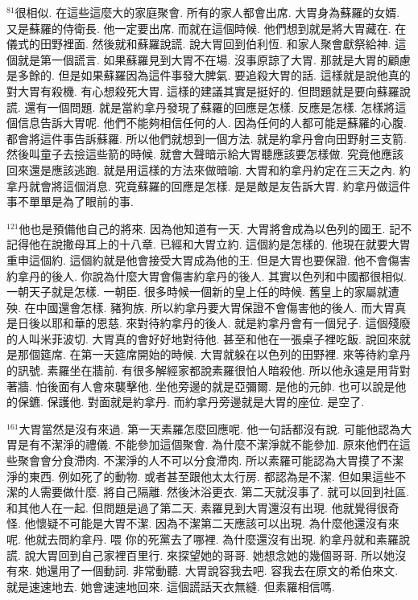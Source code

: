 \documentclass{book}
\begin{document}
$^{81}$很相似.
在這些這麼大的家庭聚會.
所有的家人都會出席.
大胃身為蘇羅的女婿.
又是蘇羅的侍衛長.
他一定要出席.
而就在這個時候.
他們想到就是將大胃藏在.
在儀式的田野裡面.
然後就和蘇羅說謊.
說大胃回到伯利恆.
和家人聚會獻祭給神.
這個就是第一個謊言.
如果蘇羅見到大胃不在場.
沒事原諒了大胃.
那就是大胃的顧慮是多餘的.
但是如果蘇羅因為這件事發大脾氣.
要追殺大胃的話.
這樣就是說他真的對大胃有殺機.
有心想殺死大胃.
這樣的建議其實是挺好的.
但問題就是要向蘇羅說謊.
還有一個問題.
就是當約拿丹發現了蘇羅的回應是怎樣.
反應是怎樣.
怎樣將這個信息告訴大胃呢.
他們不能夠相信任何的人.
因為任何的人都可能是蘇羅的心腹.
都會將這件事告訴蘇羅.
所以他們就想到一個方法.
就是約拿丹會向田野射三支箭.
然後叫童子去撿這些箭的時候.
就會大聲暗示給大胃聽應該要怎樣做.
究竟他應該回來還是應該逃跑.
就是用這樣的方法來做暗喻.
大胃和約拿丹約定在三天之內.
約拿丹就會將這個消息.
究竟蘇羅的回應是怎樣.
是是敵是友告訴大胃.
約拿丹做這件事不單單是為了眼前的事.

$^{121}$他也是預備他自己的將來.
因為他知道有一天.
大胃將會成為以色列的國王.
記不記得他在說撒母耳上的十八章.
已經和大胃立約.
這個約是怎樣的.
他現在就要大胃重申這個約.
這個約就是他會接受大胃成為他的王.
但是大胃也要保證.
他不會傷害約拿丹的後人.
你說為什麼大胃會傷害約拿丹的後人.
其實以色列和中國都很相似.
一朝天子就是怎樣.
一朝臣.
很多時候一個新的皇上任的時候.
舊皇上的家屬就遭殃.
在中國還會怎樣.
豬狗族.
所以約拿丹要大胃保證不會傷害他的後人.
而大胃真是日後以耶和華的恩慈.
來對待約拿丹的後人.
就是約拿丹會有一個兒子.
這個殘廢的人叫米菲波切.
大胃真的會好好地對待他.
甚至和他在一張桌子裡吃飯.
說回來就是那個筵席.
在第一天筵席開始的時候.
大胃就躲在以色列的田野裡.
來等待約拿丹的訊號.
素羅坐在牆前.
有很多解經家都說素羅很怕人暗殺他.
所以他永遠是用背對著牆.
怕後面有人會來襲擊他.
坐他旁邊的就是亞彌爾.
是他的元帥.
也可以說是他的保鑣.
保護他.
對面就是約拿丹.
而約拿丹旁邊就是大胃的座位.
是空了.

$^{161}$大胃當然是沒有來過.
第一天素羅怎麼回應呢.
他一句話都沒有說.
可能他認為大胃是有不潔淨的禮儀.
不能參加這個聚會.
為什麼不潔淨就不能參加.
原來他們在這些聚會會分食滯肉.
不潔淨的人不可以分食滯肉.
所以素羅可能認為大胃摸了不潔淨的東西.
例如死了的動物.
或者甚至跟他太太行房.
都認為是不潔.
但如果這些不潔的人需要做什麼.
將自己隔離.
然後沐浴更衣.
第二天就沒事了.
就可以回到社區.
和其他人在一起.
但問題是過了第二天.
素羅見到大胃還沒有出現.
他就覺得很奇怪.
他懷疑不可能是大胃不潔.
因為不潔第二天應該可以出現.
為什麼他還沒有來呢.
他就去問約拿丹.
喂 你的死黨去了哪裡.
為什麼還沒有出現.
約拿丹就和素羅說謊.
說大胃回到自己家裡百里行.
來探望她的哥哥.
她想念她的幾個哥哥.
所以她沒有來.
她還用了一個動詞.
非常動聽.
大胃說容我去吧.
容我去在原文的希伯來文.
就是速速地去.
她會速速地回來.
這個謊話天衣無縫.
但素羅相信嗎.
\end{document}
